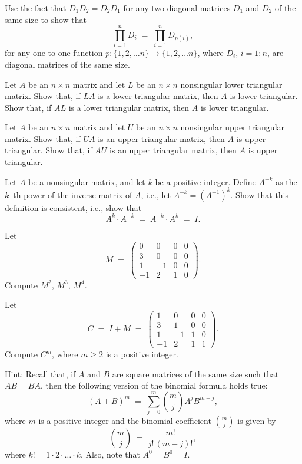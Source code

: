 \begin{exercises}
\item Use the fact that $D_1D_2=D_2D_1$ for any two diagonal matrices
$D_1$ and $D_2$ of the same size to show that
\[
\prod_{i=1}^n D_i \;=\; \prod_{i=1}^n D_{p(i)},
\]
for any one-to-one function $p:\{1,2,\ldots n\}\to\{1,2,\ldots n\}$,
where $D_i$, $i=1:n$, are diagonal matrices of the same size.

\item
\begin{subparts}
\item Let $A$ be an $n\times n$ matrix and let $L$ be an $n\times n$
nonsingular lower triangular matrix. Show that, if $LA$ is a lower
triangular matrix, then $A$ is lower triangular. Show that, if $AL$ is a
lower triangular matrix, then $A$ is lower triangular.
\item Let $A$ be an $n\times n$ matrix and let $U$ be an $n\times n$
nonsingular upper triangular matrix. Show that, if $UA$ is an upper
triangular matrix, then $A$ is upper triangular. Show that, if $AU$ is an
upper triangular matrix, then $A$ is upper triangular.
\end{subparts}

\item Let $A$ be a nonsingular matrix, and let $k$ be a positive integer.
Define $A^{-k}$ as the $k$--th power of the inverse matrix of $A$, i.e.,
let $A^{-k}=\left(A^{-1}\right)^{k}$. Show that this definition is
consistent, i.e., show that
\[
A^{k}\cdot A^{-k} \;=\; A^{-k}\cdot A^{k} \;=\; I.
\]

\item
\begin{subparts}
\item Let
\[
M \;=\; \begin{pmatrix} 0&0&0&0\\ 3&0&0&0\\ 1&-1&0&0\\ -1&2&1&0 \end{pmatrix}.
\]
Compute $M^2$, $M^3$, $M^4$.
\item Let
\[
C \;=\; I+M \;=\; \begin{pmatrix} 1&0&0&0\\ 3&1&0&0\\ 1&-1&1&0\\ -1&2&1&1 \end{pmatrix}.
\]
Compute $C^m$, where $m\ge 2$ is a positive integer.
\end{subparts}
\noindent Hint: Recall that, if $A$ and $B$ are square matrices
of the same size such that $AB=BA$, then the following version of the
binomial formula holds true:
\begin{equation}
(A+B)^m \;=\; \sum_{j=0}^m \binom{m}{j} A^{j}B^{m-j},
\end{equation}
where $m$ is a positive integer and the binomial coefficient
$\binom{m}{j}$ is given by
\[
\binom{m}{j} \;=\; \frac{m!}{j!\,(m-j)!},
\]
where $k!=1\cdot 2\cdot\ldots\cdot k$. Also, note that $A^0=B^0=I$.


\end{exercises}
